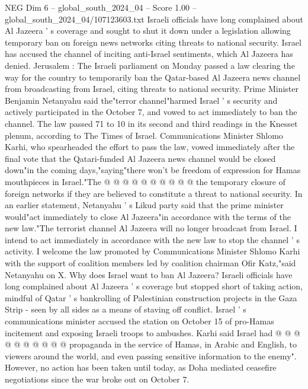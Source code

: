 \begin{textsample}{NEG Dim 6 – global\_south\_2024\_04 – Score 1.00 – global\_south\_2024\_04/107123603.txt}  \label{ex:f6_neg_336}
Israeli officials have long complained about Al Jazeera ' s coverage and sought to shut it down under a legislation allowing temporary ban on foreign news networks citing threats to national security.
Israel has accused the channel of inciting anti-Israel sentiments, which Al Jazeera has denied.
Jerusalem : The Israeli parliament on Monday passed a law clearing the way for the country to temporarily ban the Qatar-based Al Jazeera news channel from broadcasting from Israel, citing threats to national security.
Prime Minister Benjamin Netanyahu said the"terror channel"harmed Israel ' s security and actively participated in the October 7, and vowed to act immediately to ban the channel.
The law passed 71 to 10 in its second and third readings in the Knesset plenum, according to The Times of Israel.
Communications Minister Shlomo Karhi, who spearheaded the effort to pass the law, vowed immediately after the final vote that the Qatari-funded Al Jazeera news channel would be closed down"in the coming days,"saying"there won't be freedom of expression for Hamas mouthpieces in Israel."The @ @ @ @ @ @ @ @ @ @ the temporary closure of foreign networks if they are believed to constitute a threat to national security.
In an earlier statement, Netanyahu ' s Likud party said that the prime minister would"act immediately to close Al Jazeera"in accordance with the terms of the new law."The terrorist channel Al Jazeera will no longer broadcast from Israel.
I intend to act immediately in accordance with the new law to stop the channel ' s activity.
I welcome the law promoted by Communications Minister Shlomo Karhi with the support of coalition members led by coalition chairman Ofir Katz,"said Netanyahu on X.
Why does Israel want to ban Al Jazeera?
Israeli officials have long complained about Al Jazeera ' s coverage but stopped short of taking action, mindful of Qatar ' s bankrolling of Palestinian construction projects in the Gaza Strip - seen by all sides as a means of staving off conflict.
Israel ' s communications minister accused the station on October 15 of pro-Hamas incitement and exposing Israeli troops to ambushes.
Karhi said Israel had @ @ @ @ @ @ @ @ @ @ propaganda in the service of Hamas, in Arabic and English, to viewers around the world, and even passing sensitive information to the enemy".
However, no action has been taken until today, as Doha mediated ceasefire negotiations since the war broke out on October 7.

\end{textsample}
